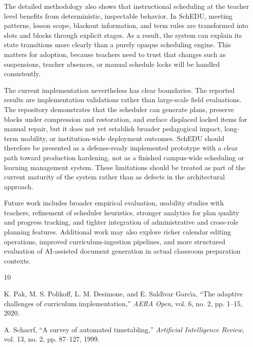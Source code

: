 \documentclass[conference]{IEEEtran}
\begin{document}
The detailed methodology also shows that instructional scheduling at the teacher
level benefits from deterministic, inspectable behavior. In SchEDU, meeting
patterns, lesson scope, blackout information, and term rules are transformed into
slots and blocks through explicit stages. As a result, the system can explain its
state transitions more clearly than a purely opaque scheduling engine. This matters
for adoption, because teachers need to trust that changes such as suspensions,
teacher absences, or manual schedule locks will be handled consistently.

The current implementation nevertheless has clear boundaries. The reported results
are implementation validations rather than large-scale field evaluations. The
repository demonstrates that the scheduler can generate plans, preserve blocks
under compression and restoration, and surface displaced locked items for manual
repair, but it does not yet establish broader pedagogical impact, long-term
usability, or institution-wide deployment outcomes. SchEDU should therefore be
presented as a defense-ready implemented prototype with a clear path toward
production hardening, not as a finished campus-wide scheduling or learning
management system. These limitations should be treated as part of the current
maturity of the system rather than as defects in the architectural approach.

Future work includes broader empirical evaluation, usability studies with teachers,
refinement of scheduler heuristics, stronger analytics for plan quality and progress
tracking, and tighter integration of administrative and cross-role planning
features. Additional work may also explore richer calendar editing operations,
improved curriculum-ingestion pipelines, and more structured evaluation of
AI-assisted document generation in actual classroom preparation contexts.

\begin{thebibliography}{10}

K. Pak, M. S. Polikoff, L. M. Desimone, and E. Sald{\'\i}var Garc{\'\i}a,
``The adaptive challenges of curriculum implementation,''
\emph{AERA Open}, vol. 6, no. 2, pp. 1--15, 2020.

A. Schaerf,
``A survey of automated timetabling,''
\emph{Artificial Intelligence Review},
vol. 13, no. 2, pp. 87--127, 1999.

\end{thebibliography}
\end{document}
